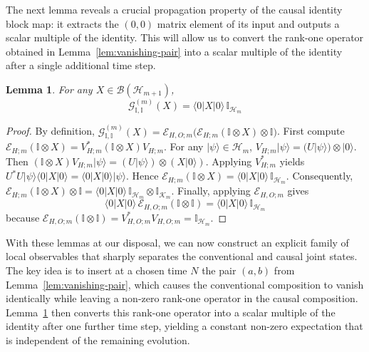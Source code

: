 \documentclass[11pt, reco]{article}
\newtheorem{lemma}[theorem]{Lemma}
\begin{document}
The next lemma reveals a crucial propagation property of the causal identity block map: it extracts the $(0,0)$ matrix element of its input and outputs a scalar multiple of the identity. This will allow us to convert the rank-one operator obtained in Lemma~\ref{lem:vanishing-pair} into a scalar multiple of the identity after a single additional time step.

\begin{lemma}\label{lem:identity-propagation}
For any $X \in \mathcal{B}(\mathcal{H}_{m+1})$,
\[
\mathcal{G}^{(m)}_{\mathbb{I},\mathbb{I}}(X) = \langle 0|X|0\rangle \, \mathbb{I}_{\mathcal{H}_m}
\]
\end{lemma}

\begin{proof}
By definition, $\mathcal{G}^{(m)}_{\mathbb{I},\mathbb{I}}(X) = \mathcal{E}_{H,O;m}\bigl(\mathcal{E}_{H;m}(\mathbb{I} \otimes X) \otimes \mathbb{I}\bigr)$. First compute $\mathcal{E}_{H;m}(\mathbb{I} \otimes X) = V_{H;m}^* (\mathbb{I} \otimes X) V_{H;m}$. For any $|\psi\rangle \in \mathcal{H}_m$, $V_{H;m}|\psi\rangle = (U|\psi\rangle) \otimes |0\rangle$. Then $(\mathbb{I} \otimes X)V_{H;m}|\psi\rangle = (U|\psi\rangle) \otimes (X|0\rangle)$. Applying $V_{H;m}^*$ yields $U^* U |\psi\rangle \langle 0|X|0\rangle = \langle 0|X|0\rangle |\psi\rangle$. Hence $\mathcal{E}_{H;m}(\mathbb{I} \otimes X) = \langle 0|X|0\rangle \, \mathbb{I}_{\mathcal{H}_m}$. Consequently, $\mathcal{E}_{H;m}(\mathbb{I} \otimes X) \otimes \mathbb{I} = \langle 0|X|0\rangle \, \mathbb{I}_{\mathcal{H}_m} \otimes \mathbb{I}_{\mathcal{K}_m}$. Finally, applying $\mathcal{E}_{H,O;m}$ gives 
$$
\langle 0|X|0\rangle \, \mathcal{E}_{H,O;m}(\mathbb{I} \otimes \mathbb{I}) = \langle 0|X|0\rangle \, \mathbb{I}_{\mathcal{H}_m}
$$
 because $\mathcal{E}_{H,O;m}(\mathbb{I} \otimes \mathbb{I}) = V_{H,O;m}^* V_{H,O;m} = \mathbb{I}_{\mathcal{H}_m}$.
\end{proof}

With these lemmas at our disposal, we can now construct an explicit family of local observables that sharply separates the conventional and causal joint states. The key idea is to insert at a chosen time $N$ the pair $(a,b)$ from Lemma~\ref{lem:vanishing-pair}, which causes the conventional composition to vanish identically while leaving a non-zero rank-one operator in the causal composition. Lemma~\ref{lem:identity-propagation} then converts this rank-one operator into a scalar multiple of the identity after one further time step, yielding a constant non-zero expectation that is independent of the remaining evolution.
\end{document}
